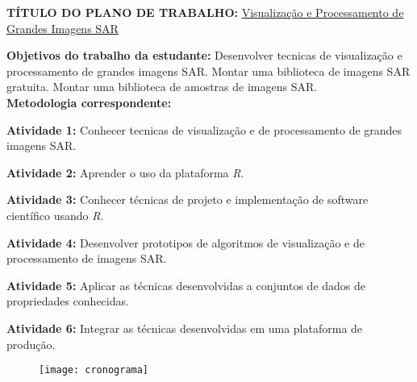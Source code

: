 \documentclass[12pt,letterpaper]{article}
\begin{document}
\textbf{TÍTULO DO PLANO DE TRABALHO:} \underline{Visualização e Processamento de Grandes Imagens SAR}

\textbf{Objetivos do trabalho da estudante:} Desenvolver tecnicas de visualização e processamento de grandes imagens SAR. Montar uma biblioteca de imagens SAR gratuita. Montar uma biblioteca de amostras de imagens SAR.\\

\textbf{Metodologia correspondente:}

\textbf{Atividade 1:} Conhecer tecnicas de visualização e de processamento de grandes imagens SAR.

\textbf{Atividade 2:} Aprender o uso da plataforma \textit{R}.

\textbf{Atividade 3:} Conhecer técnicas de projeto e implementação de software científico usando \textit{R}.

\textbf{Atividade 4:} Desenvolver prototipos de algoritmos de visualização e de processamento de imagens SAR.

\textbf{Atividade 5:} Aplicar as técnicas desenvolvidas a conjuntos de dados de propriedades conhecidas.

\textbf{Atividade 6:} Integrar as técnicas desenvolvidas em uma plataforma de produção.\\

\begin{figure}[H]
\begin{center}
\texttt{[image: cronograma]}
\end{center}
\end{figure}
\end{document}
